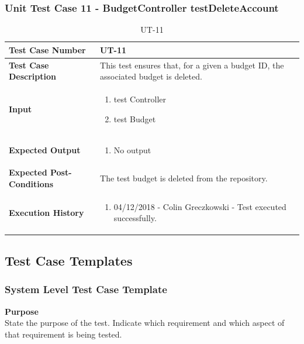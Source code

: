 \documentclass[12pt]{article}
\begin{document}
\subsubsection{Unit Test Case 11 - BudgetController testDeleteAccount}
\def\arraystretch{1.5}%
\begin{table}[htbp]
\centering
\caption{UT-11}
\label{UT-11}
\begin{tabularx}{\textwidth}{ | l | X |}
\hline
\textbf{Test Case Number}      		&  UT-11                 			\\ \hline
\textbf{Test Case Description}    	&  This test ensures that, for a given a budget ID, the associated budget is deleted. 				\\ \hline
\textbf{Input}         			& 	\begin{enumerate}
								\item test Controller
								\item test Budget
							\end{enumerate} 		\\ \hline
\textbf{Expected Output}     		& 	\begin{enumerate}
								\item No output
							\end{enumerate} 		\\ \hline
\textbf{Expected Post-Conditions}	& The test budget is deleted from the repository.             				\\ \hline
\textbf{Execution History}   		&  	\begin{enumerate}
								\item 04/12/2018 - Colin Greczkowski - Test executed successfully.
							\end {enumerate} \\ \hline
\end{tabularx}
\end{table}
\clearpage

\subsection{Test Case Templates}

\subsubsection{System Level Test Case Template}
\noindent
{\bf Purpose}\\
State the purpose of the test.
Indicate which requirement and which aspect of that requirement is being tested.
\end{document}
